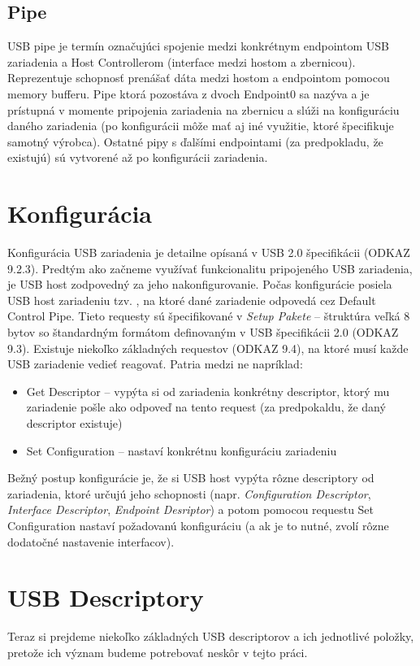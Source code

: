 \subsection*{Pipe}
USB pipe je termín označujúci spojenie medzi konkrétnym endpointom USB zariadenia a Host Controllerom (interface medzi hostom a zbernicou). Reprezentuje schopnosť prenášať dáta medzi hostom a endpointom pomocou memory bufferu. Pipe ktorá pozostáva z dvoch Endpoint0 sa nazýva  a je prístupná v momente pripojenia zariadenia na zbernicu a slúži na konfiguráciu daného zariadenia (po konfigurácii môže mať aj iné využitie, ktoré špecifikuje samotný výrobca). Ostatné pipy s ďalšími endpointami (za predpokladu, že existujú) sú vytvorené až po konfigurácii zariadenia. 



\section{Konfigurácia}
Konfigurácia USB zariadenia je detailne opísaná v USB 2.0 špecifikácii (ODKAZ 9.2.3). Predtým ako začneme využívať funkcionalitu pripojeného USB zariadenia, je USB host zodpovedný za jeho nakonfigurovanie. Počas konfigurácie posiela USB host zariadeniu tzv. , na ktoré dané zariadenie odpovedá cez Default Control Pipe. Tieto requesty sú špecifikované v \textit{Setup Pakete} -- štruktúra veľká 8 bytov so štandardným formátom definovaným v USB špecifikácii 2.0 (ODKAZ 9.3). Existuje niekoľko základných requestov (ODKAZ 9.4), na ktoré musí každe USB zariadenie vedieť reagovať. Patria medzi ne napríklad:
\begin{itemize}
\item Get Descriptor -- vypýta si od zariadenia konkrétny descriptor, ktorý mu zariadenie pošle ako odpoveď na tento request (za predpokaldu, že daný descriptor existuje)
\item Set Configuration -- nastaví konkrétnu konfiguráciu zariadeniu
\end{itemize}

Bežný postup konfigurácie je, že si USB host vypýta rôzne descriptory od zariadenia, ktoré určujú jeho schopnosti (napr. \textit{Configuration Descriptor}, \textit{Interface Descriptor}, \textit{Endpoint Desriptor}) a potom pomocou requestu Set Configuration nastaví požadovanú konfiguráciu (a ak je to nutné, zvolí rôzne dodatočné nastavenie interfacov).



\section{USB Descriptory}
Teraz si prejdeme niekoľko základných USB descriptorov a ich jednotlivé položky, pretože ich význam budeme potrebovať neskôr v tejto práci. 


